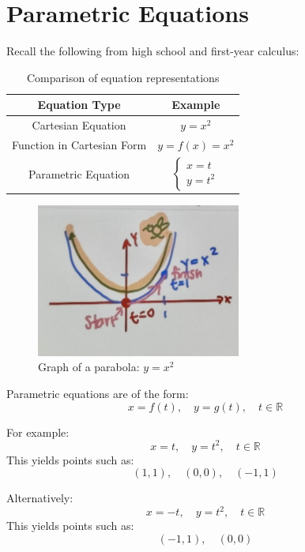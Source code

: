 \documentclass[12pt]{article}
\begin{document}
\renewcommand{\familydefault}{\rmdefault}



\pagebreak
\normalsize

\section*{Parametric Equations}
Recall the following from high school and first-year calculus:

\begin{table}[h!]
\centering
\begin{tabular}{|c|c|}
\hline
\textbf{Equation Type}     & \textbf{Example}             \\ \hline
Cartesian Equation         & $y = x^2$                   \\ \hline
Function in Cartesian Form & $y = f(x) = x^2$            \\ \hline
Parametric Equation        & $\begin{cases} 
x = t \\ 
y = t^2 
\end{cases}$ \\ \hline
\end{tabular}
\caption{Comparison of equation representations}
\label{tab:equation_comparison}
\end{table}

\begin{figure}[h!]
\centering
\includegraphics[width=0.6\textwidth]{parabola.jpg}
\caption{Graph of a parabola: $y = x^2$}
\label{fig:parabola}
\end{figure}

Parametric equations are of the form:
\[
x = f(t), \quad y = g(t), \quad t \in \mathbb{R}
\]

For example:
\[
x = t, \quad y = t^2, \quad t \in \mathbb{R}
\]
This yields points such as:
\[
(1, 1), \quad (0, 0), \quad (-1, 1)
\]

Alternatively:
\[
x = -t, \quad y = t^2, \quad t \in \mathbb{R}
\]
This yields points such as:
\[
(-1, 1), \quad (0, 0)
\]
\end{document}
